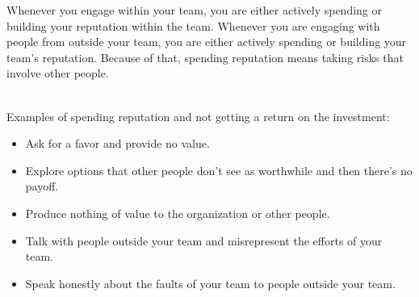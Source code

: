 Whenever you engage within your team, you are either actively spending or building your reputation within the team.
Whenever you are engaging with people from outside your team, you are either actively spending or building your team's reputation.
Because of that, spending reputation means taking risks that involve other people.

\ \\

Examples of spending reputation and not getting a return on the investment:
\begin{itemize}
    \item Ask for a favor and provide no value.
    \item Explore options that other people don't see as worthwhile and then there's no payoff.
    \item Produce nothing of value to the organization or other people.
    \item Talk with people outside your team and misrepresent the efforts of your team.
    \item Speak honestly about the faults of your team to people outside your team.
\end{itemize}













